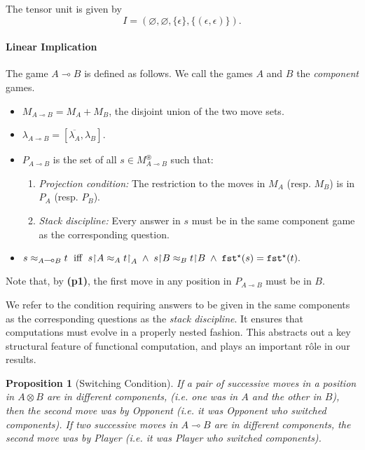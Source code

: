 \documentclass[11pt]{article}
\newtheorem{proposition}[theorem]{Proposition}
\newcommand{\Fst}{{\tt fst}}
\newcommand{\plays}[1]{M^{\circledast}_{#1}}
\newcommand{\Rest}{{\upharpoonright}}
\newcommand{\Deq}{\approx}
\newcommand{\IFF}{\;\mbox{ iff }\;}
\newcommand{\tensor}{\mbox{$\otimes$}}
\newcommand{\linimpl}{\mbox{$\multimap$}}
\newcommand{\tunit}{I}
\begin{document}
The tensor unit is given by
\[ \tunit = (\varnothing,\varnothing,\{\epsilon \}, \{ (\epsilon , \epsilon )
\} ). \]

\paragraph{Linear Implication}
The game $A \linimpl B$ is defined as follows.   We call the games $A$
and $B$ the {\sl component} games.

\begin{itemize}
\item $M_{A \linimpl B} = M_A + M_B$, the disjoint union of the two move
sets.
\item $\lambda_{A \linimpl B} = [\overline{\lambda_{A}},\lambda_B]$.
\item $P_{A \linimpl B}$ is the set of all $s \in \plays{A \linimpl B}$
such that:
\begin{enumerate}
\item {\em Projection condition:} The restriction to the moves in $M_A$ (resp. $M_B$) is in
$P_A$ (resp. $P_B$).
\item {\em Stack discipline:} Every answer in $s$ must be in the same component game as the
  corresponding question.
\end{enumerate}

\item $s \Deq_{A \linimpl B} t \IFF  s \Rest A \Deq_{A} t \Rest_{A} \;
\wedge \; s \Rest B \Deq_{B} t \Rest B \; \wedge \; \Fst^{\star}(s) =
\Fst^{\star}(t).$
\end{itemize}
Note that, by {\bf (p1)}, the first move in any position in
$P_{A \linimpl B}$ must be in $B$.

We refer to the condition requiring answers to be given in the same
components as the corresponding questions as the {\sl stack discipline}.
It ensures that computations must evolve in a properly nested fashion.
This abstracts out a key structural feature of functional computation, and plays
an important r\^{o}le in our results.

\begin{proposition}[Switching Condition]
If a pair of successive moves in a position in $A \tensor B$ are in different
components, (i.e. one was in $A$ and the other in $B$),
then the second move was by Opponent (i.e. it was Opponent who
switched components). If two successive moves in $A \linimpl B$ are
in different components, the second move was by Player (i.e. it was Player
who switched components).
\end{proposition}
\end{document}

